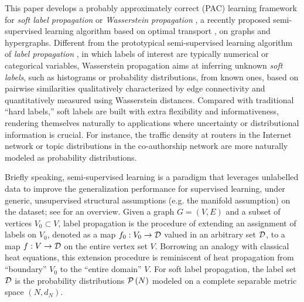 \documentclass[letterpaper]{article} %
\begin{document}
This paper develops a probably approximately correct (PAC) learning framework for \emph{soft label propagation} or \emph{Wasserstein propagation} \cite{Solomon:2014}, a recently proposed semi-supervised learning algorithm based on optimal transport \cite{villani2003topics,villani2008optimal}, on graphs and hypergraphs. Different from the prototypical semi-supervised learning algorithm of \emph{label propagation} \cite{Belkin2004}, in which labels of interest are typically numerical or categorical variables, Wasserstein propagation aims at inferring unknown \emph{soft labels}, such as histograms or probability distributions, from known ones, based on pairwise similarities qualitatively characterized by edge connectivity and quantitatively measured using Wasserstein distances. Compared with traditional ``hard labels,'' soft labels are built with extra flexibility and informativeness, rendering themselves naturally to applications where uncertainty or distributional information is crucial. For instance, the traffic density at routers in the Internet network or topic distributions in the co-authorship network are more naturally modeled as probability distributions.

Briefly speaking, semi-supervised learning is a paradigm that leverages unlabelled data to improve the generalization performance for supervised learning, under generic, unsupervised structural assumptions (e.g. the manifold assumption) on the dataset; see \cite{Seeger01learningwith,Zhu06SSL,CSZ2006} for an overview. Given a graph $G=\left( V,E \right)$ and a subset of vertices $V_0\subset V$, label propagation is the procedure of extending an assignment of labels on $V_0$, denoted as a map $f_0:V_0\rightarrow \D$ valued in an arbitrary set $\D$, to a map $f:V\rightarrow\D$ on the entire vertex set $V$. Borrowing an analogy with classical heat equations, this extension procedure is reminiscent of heat propagation from ``boundary'' $V_0$ to the ``entire domain'' $V$. For soft label propagation, the label set $\D$ is the probability distributions $\P \left( N \right)$ modeled on a complete separable metric space $\left( N,d_N \right)$. %
\end{document}
